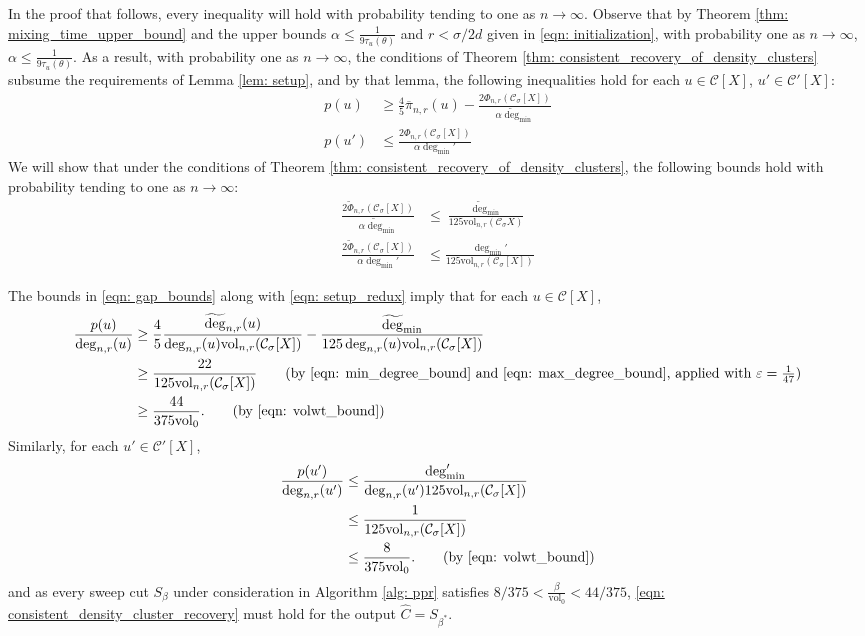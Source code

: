 \documentclass[11pt,twoside]{article}
\newcommand{\vol}{\mathrm{vol}}
\newcommand{\1}{\mathbf{1}}
\newcommand{\pbf}{p}        %
\newcommand{\pibf}{\pi}
\newcommand{\Xbf}{X}             %
\newcommand{\Cset}{\mathcal{C}}
\newcommand{\Csig}{\Cset_{\sigma}}
\newcommand{\degminpr}{\deg_{\min}'}
\newcommand{\degminwt}{\widetilde{\deg}_{\min}}
\begin{document}
In the proof that follows, every inequality will hold with probability tending to one as $n \to \infty$.
Observe that by Theorem \ref{thm: mixing_time_upper_bound} and the upper bounds $\alpha \leq \frac{1}{9 \tau_{u}(\theta)}$ and $r < \sigma/2d$ given in \eqref{eqn: initialization}, with probability one as $n \to \infty$, $\alpha \leq \frac{1}{9 \tau_{u}(\theta)}$. As a result, with probability one as $n \to \infty$, the conditions of Theorem \ref{thm: consistent_recovery_of_density_clusters} subsume the requirements of Lemma \ref{lem: setup}, and by that lemma, the following inequalities hold for each $u \in \Cset[\Xbf]$, $u' \in \Cset'[\Xbf]$:
\begin{align}
\pbf(u) & \geq \frac{4}{5} \overline{\pibf}_{n,r}(u) - \frac{2 \Phi_{n,r}(\Csig[\Xbf])}{\alpha \degminwt} \nonumber \\
\pbf(u') & \leq \frac{2 \Phi_{n,r}(\Csig[\Xbf])}{\alpha \degminpr} \label{eqn: setup_redux}
\end{align}
We will show that under the conditions of Theorem \ref{thm: consistent_recovery_of_density_clusters}, the following bounds hold with probability tending to one as $n \to \infty$:
\begin{align}
\frac{2\widetilde{\Phi}_{n,r}(\Csig[\Xbf])}{\alpha \degminwt} & \leq \frac{\degminwt}{125 \vol_{n,r}(\Csig{\Xbf})} \nonumber \\
\frac{2\widetilde{\Phi}_{n,r}(\Csig[\Xbf])}{\alpha \degminpr} & \leq \frac{\degminpr}{125 \vol_{n,r}(\Csig[\Xbf])} \label{eqn: gap_bounds}
\end{align}

The bounds in \eqref{eqn: gap_bounds} along with \eqref{eqn: setup_redux} imply that for each $u \in \Cset[\Xbf]$,
\begin{align*}
\frac{\pbf(u)}{\deg_{n,r}(u)} & \geq \frac{4}{5} \frac{\widetilde{\deg}_{n,r}(u)}{\deg_{n,r}(u) \vol_{n,r}(\Csig[\Xbf])} - \frac{\degminwt}{125 \deg_{n,r}(u) \vol_{n,r}(\Csig[\Xbf])} \\
& \geq \frac{22}{125 \vol_{n,r}(\Csig[\Xbf])} \tag{by \eqref{eqn: min_degree_bound} and \eqref{eqn: max_degree_bound}, applied with $\varepsilon = \frac{1}{47}$} \\
& \geq \frac{44}{375 \vol_0}. \tag{by \eqref{eqn: volwt_bound}}
\end{align*}
Similarly, for each $u' \in \Cset'[\Xbf]$,
\begin{align*}
\frac{\pbf(u')}{\deg_{n,r}(u')} & \leq \frac{\degminpr}{\deg_{n,r}(u') 125 \vol_{n,r}(\Csig[\Xbf])}  \\
& \leq \frac{1}{125 \vol_{n,r}(\Csig[\Xbf])} \\
& \leq \frac{8}{375 \vol_0}. \tag{by \eqref{eqn: volwt_bound}}
\end{align*}
and as every sweep cut $S_\beta$ under consideration in Algorithm \ref{alg: ppr} satisfies $8/375 < \frac{\beta}{\vol_0} < 44/375$, \eqref{eqn: consistent_density_cluster_recovery} must hold for the output $\widehat{C} = S_{\beta^*}$.
\end{document}
